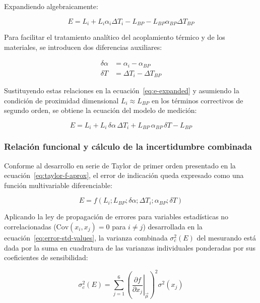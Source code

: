 Expandiendo algebraicamente:

\begin{equation}
  E = L_i + L_i \alpha_i \Delta T_i - L_{BP} - L_{BP} \alpha_{BP} \Delta T_{BP}
  \label{eq:e-expanded}
\end{equation}

Para facilitar el tratamiento analítico del acoplamiento térmico y de los materiales, se introducen dos diferencias auxiliares:

\begin{align}
  \delta\alpha &= \alpha_i - \alpha_{BP}
  \label{eq:dalpha} \\
  \delta T &= \Delta T_i - \Delta T_{BP}
  \label{eq:dT}
\end{align}

Sustituyendo estas relaciones en la ecuación~\eqref{eq:e-expanded} y asumiendo la condición de proximidad dimensional $L_i \approx L_{BP}$ en los términos correctivos de segundo orden, se obtiene la ecuación del modelo de medición:

\begin{equation}
  E = L_i + L_i \, \delta\alpha \, \Delta T_i + L_{BP} \, \alpha_{BP} \, \delta T - L_{BP}
  \label{eq:e-model}
\end{equation}

\subsubsection*{Relación funcional y cálculo de la incertidumbre combinada}

Conforme al desarrollo en serie de Taylor de primer orden presentado en la ecuación~\eqref{eq:taylor-f-aprox}, el error de indicación queda expresado como una función multivariable diferenciable:

\begin{equation}
  E = f(L_i; L_{BP}; \delta\alpha; \Delta T_i; \alpha_{BP}; \delta T)
  \label{eq:e-func}
\end{equation}

Aplicando la ley de propagación de errores para variables estadísticas no correlacionadas ($\text{Cov}(x_i, x_j) = 0$ para $i \neq j$) desarrollada en la ecuación~\eqref{eq:error-std-values}, la varianza combinada $\sigma_c^2(E)$ del mesurando está dada por la suma en cuadratura de las varianzas individuales ponderadas por sus coeficientes de sensibilidad:

\begin{equation}
  \sigma_c^2(E) = \sum_{j=1}^6 \left( \left. \frac{\partial f}{\partial x_j} \right|_{\vec{\mu}} \right)^2 \sigma^2(x_j)
  \label{eq:gum}
\end{equation}

